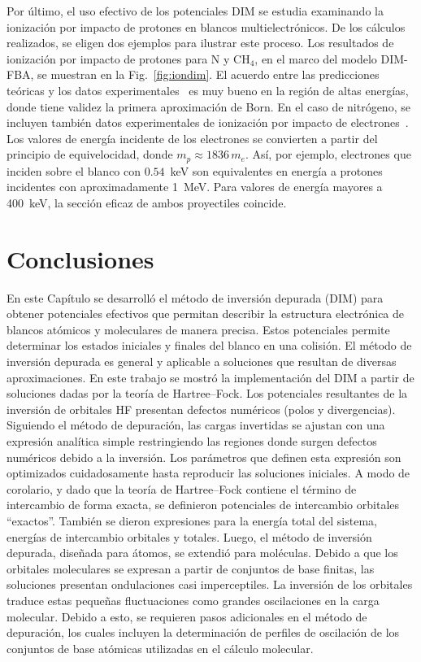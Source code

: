 Por último, el uso efectivo de los potenciales DIM se estudia examinando 
la ionización por impacto de protones en blancos multielectrónicos. De 
los cálculos realizados, se eligen dos ejemplos para ilustrar este 
proceso. Los resultados de ionización por impacto de protones para N y 
CH$_4$, en el marco del modelo DIM-FBA, se muestran en la 
Fig.~\ref{fig:iondim}. El acuerdo entre las predicciones teóricas y los 
datos experimentales~\cite{Rudd:83,Rudd:85} es muy bueno en la región de 
altas energías, donde tiene validez la primera aproximación de Born. En 
el caso de nitrógeno, se incluyen también datos experimentales de 
ionización por impacto de electrones~\cite{Brook:78}. Los valores de 
energía incidente de los electrones se convierten a partir del principio 
de equivelocidad, donde $m_p\approx 1836\,m_e$. Así, por ejemplo, 
electrones que inciden sobre el blanco con $0.54$~keV son equivalentes 
en energía a protones incidentes con aproximadamente 1~MeV. Para valores 
de energía mayores a 400~keV, la sección eficaz de ambos proyectiles 
coincide. 

\section{Conclusiones}
\label{sec:conclu-dim}

En este Capítulo se desarrolló el método de inversión depurada (DIM) 
para obtener potenciales efectivos que permitan describir la estructura 
electrónica de blancos atómicos y moleculares de manera precisa. Estos 
potenciales permite determinar los estados iniciales y finales del 
blanco en una colisión. El método de inversión depurada es general y 
aplicable a soluciones que resultan de diversas aproximaciones. En este 
trabajo se mostró la implementación del DIM a partir de soluciones dadas 
por la teoría de Hartree--Fock. Los potenciales resultantes de la 
inversión de orbitales HF presentan defectos numéricos (polos y 
divergencias). Siguiendo el método de depuración, las cargas invertidas 
se ajustan con una expresión analítica simple restringiendo las regiones 
donde surgen defectos numéricos debido a la inversión. Los parámetros 
que definen esta expresión son optimizados cuidadosamente hasta 
reproducir las soluciones iniciales. A modo de corolario, y dado que la 
teoría de Hartree--Fock contiene el término de intercambio de forma 
exacta, se definieron potenciales de intercambio orbitales ``exactos''. 
También se dieron expresiones para la energía total del sistema, 
energías de intercambio orbitales y totales. Luego, el método de 
inversión depurada, diseñada para átomos, se extendió para moléculas. 
Debido a que los orbitales moleculares se expresan a partir de conjuntos 
de base finitas, las soluciones presentan ondulaciones casi 
imperceptiles. La inversión de los orbitales traduce estas pequeñas 
fluctuaciones como grandes oscilaciones en la carga molecular. Debido a 
esto, se requieren pasos adicionales en el método de depuración, los 
cuales incluyen la determinación de perfiles de oscilación de los 
conjuntos de base atómicas utilizadas en el cálculo molecular. 

